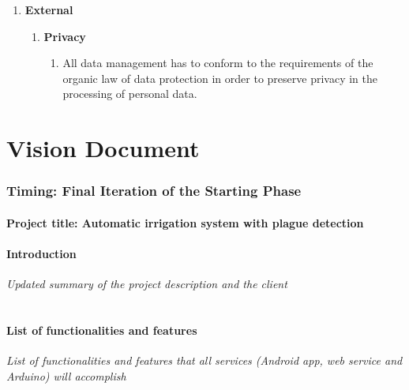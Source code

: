 \documentclass[11pt,a4paper]{article}
\begin{document}
\begin{enumerate}
\item \textbf{External}
	\begin{enumerate}
	\item \textbf{Privacy} 
		\begin{enumerate}
		\item All data management has to conform to the requirements of the organic law of data protection in order to preserve privacy in the processing of personal data.
		\end{enumerate}
		
	\end{enumerate}

\end{enumerate}

\newpage

\part{Vision Document}
\section{Timing: Final Iteration of the Starting Phase}
\subsection*{Project title: Automatic irrigation system with plague detection}
\subsection{Introduction}
\textit{Updated summary of the project description and the client}\\\\
\subsection{List of functionalities and features}
\textit{List of functionalities and features that all services (Android app, web service and Arduino) will accomplish}
\end{document}
